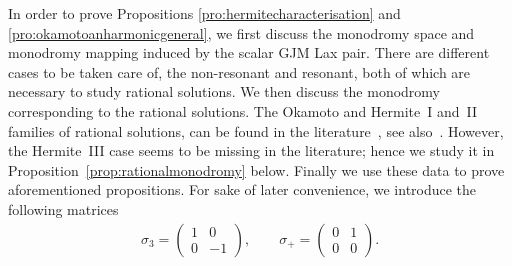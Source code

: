 \documentclass[pdftex]{sigma}
\numberwithin{equation}{section}
\begin{document}
In order to prove Propositions \ref{pro:hermitecharacterisation} and \ref{pro:okamotoanharmonicgeneral},
we f\/irst discuss the monodromy space and monodromy mapping induced by the scalar GJM Lax pair.
There are dif\/ferent cases to be taken care of, the non-resonant and resonant, both of which are necessary to
study rational solutions. We then discuss the monodromy corresponding to the rational solutions. The Okamoto and
Hermite~I and~II families of rational solutions, can be found in the literature~\cite{kapaev1998}, see also~\cite{milne}.
However, the Hermite~III case seems to be missing in the literature; hence we study it in Proposition~\ref{prop:rationalmonodromy} below.
Finally we use these data to prove aforementioned propositions. For sake of later convenience, we introduce the following matrices
\begin{gather*}
\sigma_3=\begin{pmatrix}
1 & 0\\
0 & -1
\end{pmatrix},\qquad \sigma_+=\begin{pmatrix}
0 & 1 \\
0 & 0
\end{pmatrix}.
\end{gather*}
\end{document}
